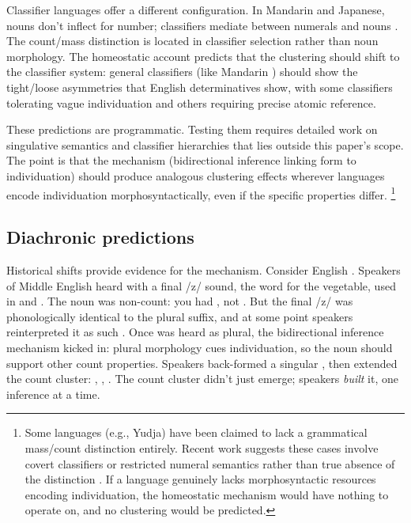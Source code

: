 \documentclass[12pt,a4paper]{article}
\begin{document}
Classifier languages offer a different configuration. In Mandarin and Japanese, nouns don't inflect for number; classifiers mediate between numerals and nouns \citep{cheng1998,downing1996}. The count/mass distinction is located in classifier selection rather than noun morphology. The homeostatic account predicts that the clustering should shift to the classifier system: general classifiers (like Mandarin ) should show the tight/loose asymmetries that English determinatives show, with some classifiers tolerating vague individuation and others requiring precise atomic reference.

These predictions are programmatic. Testing them requires detailed work on singulative semantics and classifier hierarchies that lies outside this paper's scope. The point is that the mechanism (bidirectional inference linking form to individuation) should produce analogous clustering effects wherever languages encode individuation morphosyntactically, even if the specific properties differ.%
\footnote{Some languages (e.g., Yudja) have been claimed to lack a grammatical mass/count distinction entirely. Recent work suggests these cases involve covert classifiers or restricted numeral semantics rather than true absence of the distinction \citep{lima2014}. If a language genuinely lacks morphosyntactic resources encoding individuation, the homeostatic mechanism would have nothing to operate on, and no clustering would be predicted.}

\subsection{Diachronic predictions}

Historical shifts provide evidence for the mechanism. Consider English . Speakers of Middle English heard  with a final /z/ sound, the word for the vegetable, used in  and . The noun was non-count: you had , not . But the final /z/ was phonologically identical to the plural suffix, and at some point speakers reinterpreted it as such \citep[s.v.\ , \textit{n.\textsuperscript{1}}]{oed}. Once  was heard as plural, the bidirectional inference mechanism kicked in: plural morphology cues individuation, so the noun should support other count properties. Speakers back-formed a singular , then extended the count cluster: , , . The count cluster didn't just emerge; speakers \textit{built} it, one inference at a time.
\end{document}
